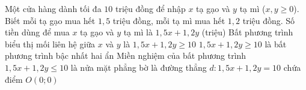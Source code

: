 \begin{ex}%
	Một cửa hàng dành tối đa $10$ triệu đồng để nhập $x$ tạ gạo và $y$ tạ mì ($x, y\geq0$). Biết mỗi tạ gạo mua hết $1{,}5$ triệu đồng, mỗi tạ mì mua hết $1{,}2$ triệu đồng.
	\choiceTF
	{\True Số tiền dùng để mua $x$ tạ gạo và $y$ tạ mì là $1{,}5x + 1{,}2y$ (triệu)}
	{Bất phương trình biểu thị mối liên hệ giữa $x$ và $y$ là $1{,}5x+1{,}2y\ge10$}
	{$1{,}5x+1{,}2y\geq10$ là bất phương trình bậc nhất hai ẩn}
	{\True Miền nghiệm của bất phương trình $1{,}5x + 1{,}2y\leq10$ là nửa mặt phẳng bờ là đường thẳng $d\colon1{,}5x+1{,}2y=10$ chứa điểm $O(0;0)$}
\end{ex}
